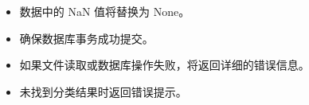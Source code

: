 \documentclass[a4paper,12pt,english]{sphinxmanual}
\begin{document}
\begin{fulllineitems}
\begin{description}
\begin{itemize}
\item {} 
\sphinxAtStartPar
数据中的 NaN 值将替换为 None。

\item {} 
\sphinxAtStartPar
确保数据库事务成功提交。

\end{itemize}

\begin{itemize}
\item {} 
\sphinxAtStartPar
如果文件读取或数据库操作失败，将返回详细的错误信息。

\item {} 
\sphinxAtStartPar
未找到分类结果时返回错误提示。

\end{itemize}

\end{description}

\end{fulllineitems}

\end{document}
